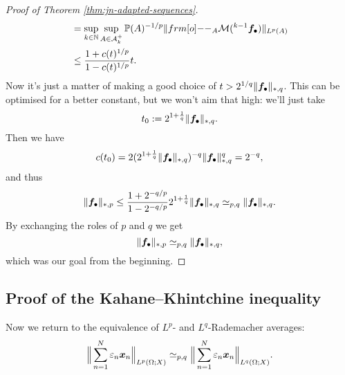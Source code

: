 \begin{proof}[Proof of Theorem \ref{thm:jn-adapted-sequences}]
\begin{equation*}
\begin{aligned}
      &= \sup_{k \in \N} \sup_{A \in \mc{A}_{k}^{+}} \P(A)^{-1/p} \|\1_{A} \mc{M}({}^{k-1}\mb{f}_{\bullet}) \|_{L^p(A)} \\
      &\leq \frac{1 + c(t)^{1/p}}{1 - c(t)^{1/p}} t .
    \end{aligned}
  \end{equation*}
  Now it's just a matter of making a good choice of $t > 2^{1/q} \|\bm{f}_{\bullet}\|_{*,q}$.
  This can be optimised for a better constant, but we won't aim that high: we'll just take
  \begin{equation*}
    t_{0} := 2^{1 + \frac{1}{q}} \|\bm{f}_{\bullet}\|_{*,q}.
  \end{equation*}
  Then we have
  \begin{equation*}
    c(t_0) = 2(2^{1 + \frac{1}{q}} \|\bm{f}_{\bullet}\|_{*,q})^{-q} \|\bm{f}_{\bullet}\|_{*,q}^{q} = 2^{-q},
  \end{equation*}
  and thus
  \begin{equation*}
    \|\bm{f}_{\bullet}\|_{*,p} \leq \frac{1 + 2^{-q/p}}{1 - 2^{-q/p}} 2^{1 + \frac{1}{q}} \|\bm{f}_{\bullet}\|_{*,q} \simeq_{p,q} \|\bm{f}_{\bullet}\|_{*,q}.
  \end{equation*}
  By exchanging the roles of $p$ and $q$ we get
  \begin{equation*}
    \|\bm{f}_{\bullet}\|_{*,p} \simeq_{p,q} \|\bm{f}_{\bullet}\|_{*,q},
  \end{equation*}
  which was our goal from the beginning.
  
\end{proof}

\subsection{Proof of the Kahane--Khintchine inequality}

Now we return to the equivalence of $L^p$- and $L^q$-Rademacher averages:
\begin{equation*}
  \Big\|\sum_{n=1}^{N} \varepsilon_{n} \bm{x}_{n} \Big\|_{L^p(\Omega;X)} \simeq_{p,q} \Big\|\sum_{n=1}^{N} \varepsilon_{n} \bm{x}_{n} \Big\|_{L^q(\Omega;X)}.
\end{equation*}

